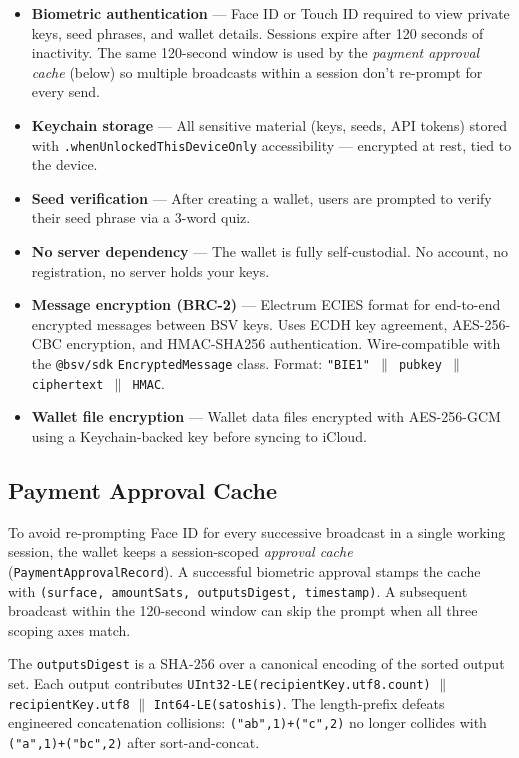 \documentclass[a4paper, 11pt, openany]{book}
\begin{document}
\begin{itemize}
\item \textbf{Biometric authentication} --- Face ID or Touch ID required to view private keys, seed phrases, and wallet details. Sessions expire after 120 seconds of inactivity. The same 120-second window is used by the \emph{payment approval cache} (below) so multiple broadcasts within a session don't re-prompt for every send.
\item \textbf{Keychain storage} --- All sensitive material (keys, seeds, API tokens) stored with \texttt{.whenUnlockedThisDeviceOnly} accessibility --- encrypted at rest, tied to the device.
\item \textbf{Seed verification} --- After creating a wallet, users are prompted to verify their seed phrase via a 3-word quiz.
\item \textbf{No server dependency} --- The wallet is fully self-custodial. No account, no registration, no server holds your keys.
\item \textbf{Message encryption (BRC-2)} --- Electrum ECIES format for end-to-end encrypted messages between BSV keys. Uses ECDH key agreement, AES-256-CBC encryption, and HMAC-SHA256 authentication. Wire-compatible with the \texttt{@bsv/sdk} \texttt{EncryptedMessage} class. Format: \texttt{"BIE1" $\|$ pubkey $\|$ ciphertext $\|$ HMAC}.
\item \textbf{Wallet file encryption} --- Wallet data files encrypted with AES-256-GCM using a Keychain-backed key before syncing to iCloud.
\end{itemize}

\subsection{Payment Approval Cache}

To avoid re-prompting Face ID for every successive broadcast in a single working session, the wallet keeps a session-scoped \emph{approval cache} (\texttt{PaymentApprovalRecord}). A successful biometric approval stamps the cache with \texttt{(surface, amountSats, outputsDigest, timestamp)}. A subsequent broadcast within the 120-second window can skip the prompt when all three scoping axes match.

The \texttt{outputsDigest} is a SHA-256 over a canonical encoding of the sorted output set. Each output contributes \texttt{UInt32-LE(recipientKey.utf8.count)} $\|$ \texttt{recipientKey.utf8} $\|$ \texttt{Int64-LE(satoshis)}. The length-prefix defeats engineered concatenation collisions: \texttt{("ab",1)+("c",2)} no longer collides with \texttt{("a",1)+("bc",2)} after sort-and-concat.
\end{document}
